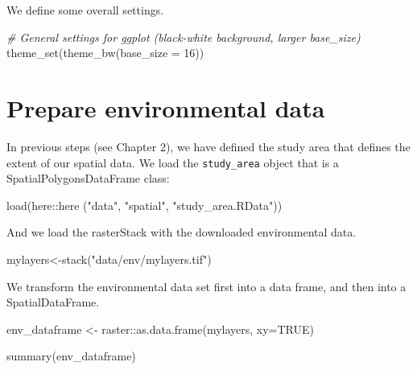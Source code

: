 \documentclass[
]{book}
\newenvironment{Shaded}{\begin{snugshade}}{\end{snugshade}}
\newcommand{\AttributeTok}[1]{\textcolor[rgb]{0.77,0.63,0.00}{#1}}
\newcommand{\CommentTok}[1]{\textcolor[rgb]{0.56,0.35,0.01}{\textit{#1}}}
\newcommand{\ConstantTok}[1]{\textcolor[rgb]{0.00,0.00,0.00}{#1}}
\newcommand{\DecValTok}[1]{\textcolor[rgb]{0.00,0.00,0.81}{#1}}
\newcommand{\FunctionTok}[1]{\textcolor[rgb]{0.00,0.00,0.00}{#1}}
\newcommand{\NormalTok}[1]{#1}
\newcommand{\OtherTok}[1]{\textcolor[rgb]{0.56,0.35,0.01}{#1}}
\newcommand{\SpecialCharTok}[1]{\textcolor[rgb]{0.00,0.00,0.00}{#1}}
\newcommand{\StringTok}[1]{\textcolor[rgb]{0.31,0.60,0.02}{#1}}
\begin{document}
We define some overall settings.

\begin{Shaded}
\begin{Highlighting}[]
\CommentTok{\# General settings for ggplot (black{-}white background, larger base\_size)}
\FunctionTok{theme\_set}\NormalTok{(}\FunctionTok{theme\_bw}\NormalTok{(}\AttributeTok{base\_size =} \DecValTok{16}\NormalTok{))}
\end{Highlighting}
\end{Shaded}

\hypertarget{prepare-environmental-data}{%
\section{Prepare environmental data}\label{prepare-environmental-data}}

In previous steps (see Chapter 2), we have defined the study area that defines the extent of our spatial data. We load the \texttt{study\_area} object that is a SpatialPolygonsDataFrame class:

\begin{Shaded}
\begin{Highlighting}[]
\FunctionTok{load}\NormalTok{(here}\SpecialCharTok{::}\FunctionTok{here}\NormalTok{ (}\StringTok{"data"}\NormalTok{, }\StringTok{"spatial"}\NormalTok{, }\StringTok{"study\_area.RData"}\NormalTok{))}
\end{Highlighting}
\end{Shaded}

And we load the rasterStack with the downloaded environmental data.

\begin{Shaded}
\begin{Highlighting}[]
\NormalTok{mylayers}\OtherTok{\textless{}{-}}\FunctionTok{stack}\NormalTok{(}\StringTok{"data/env/mylayers.tif"}\NormalTok{)}
\end{Highlighting}
\end{Shaded}

We transform the environmental data set first into a data frame, and then into a SpatialDataFrame.

\begin{Shaded}
\begin{Highlighting}[]
\NormalTok{env\_dataframe }\OtherTok{\textless{}{-}}\NormalTok{ raster}\SpecialCharTok{::}\FunctionTok{as.data.frame}\NormalTok{(mylayers, }\AttributeTok{xy=}\ConstantTok{TRUE}\NormalTok{)}

\FunctionTok{summary}\NormalTok{(env\_dataframe)}
\end{Highlighting}
\end{Shaded}
\end{document}
